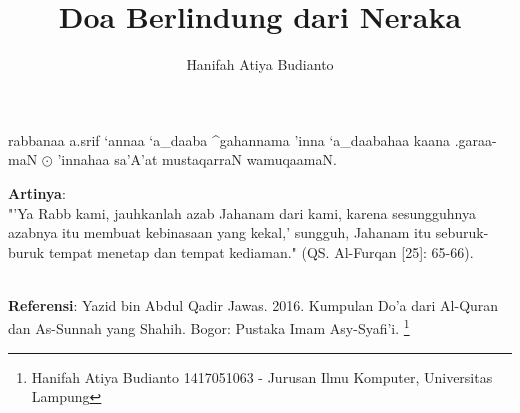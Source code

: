 \documentclass[a4paper,12pt]{article}
\title{\Large Doa Berlindung dari Neraka}
\author{\calligra Hanifah Atiya Budianto}
\begin{document}
\sffamily
\maketitle 
\fullvocalize
{}
\begin{arabtext}
\noindent
rabbanaa a.srif `annaa `a_daaba ^gahannama 'inna `a_daabahaa kaana 
.garaa-maN $\odot$ 'innahaa sa'A'at mustaqarraN wamuqaamaN.\\
\end{arabtext}
\noindent
\textbf{Artinya}:\\
\indent
"'Ya Rabb kami, jauhkanlah azab Jahanam dari kami, karena sesungguhnya 
azabnya itu membuat kebinasaan yang kekal,' sungguh, Jahanam itu 
seburuk-buruk tempat menetap dan tempat kediaman." (QS. Al-Furqan [25]: 
65-66).\\\\
\par
\noindent
\textbf{Referensi}: Yazid bin Abdul Qadir Jawas. 2016. Kumpulan Do'a dari
Al-Quran dan As-Sunnah yang Shahih. Bogor: Pustaka Imam Asy-Syafi'i.
\footnote{Hanifah Atiya Budianto 1417051063 - Jurusan Ilmu Komputer,
Universitas Lampung}
\end{document}

